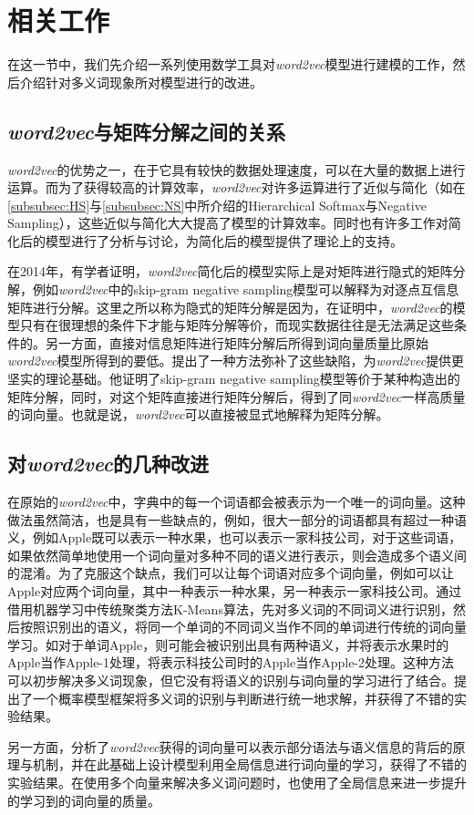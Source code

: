 \iffalse



\fi

\chapter{相关工作}

在这一节中，我们先介绍一系列使用数学工具对\emph{word2vec}模型进行建模的工作，然后介绍针对多义词现象所对模型进行的改进。

\section{\emph{word2vec}与矩阵分解之间的关系}
\label{sec:word2vecmf}

\emph{word2vec}的优势之一，在于它具有较快的数据处理速度，可以在大量的数据上进行运算。而为了获得较高的计算效率，\emph{word2vec}对许多运算进行了近似与简化（如在\ref{subsubsec:HS}与\ref{subsubsec:NS}中所介绍的Hierarchical Softmax与Negative Sampling），这些近似与简化大大提高了模型的计算效率。同时也有许多工作对简化后的模型进行了分析与讨论，为简化后的模型提供了理论上的支持。

在2014年，有学者证明，\emph{word2vec}简化后的模型实际上是对矩阵进行隐式的矩阵分解\citep{levy2014neural}，例如\emph{word2vec}中的skip-gram negative sampling模型可以解释为对逐点互信息矩阵进行分解。这里之所以称为隐式的矩阵分解是因为，在证明中，\emph{word2vec}的模型只有在很理想的条件下才能与矩阵分解等价，而现实数据往往是无法满足这些条件的。另一方面，直接对信息矩阵进行矩阵分解后所得到词向量质量比原始\emph{word2vec}模型所得到的要低。\citep{li2015word}提出了一种方法弥补了这些缺陷，为\emph{word2vec}提供更坚实的理论基础。他证明了skip-gram negative sampling模型等价于某种构造出的矩阵分解，同时，对这个矩阵直接进行矩阵分解后，得到了同\emph{word2vec}一样高质量的词向量。也就是说，\emph{word2vec}可以直接被显式地解释为矩阵分解。

\section{对\emph{word2vec}的几种改进}
\label{sec:intro_poly}

在原始的\emph{word2vec}中，字典中的每一个词语都会被表示为一个唯一的词向量。这种做法虽然简洁，也是具有一些缺点的，例如，很大一部分的词语都具有超过一种语义，例如Apple既可以表示一种水果，也可以表示一家科技公司，对于这些词语，如果依然简单地使用一个词向量对多种不同的语义进行表示，则会造成多个语义间的混淆。为了克服这个缺点，我们可以让每个词语对应多个词向量，例如可以让Apple对应两个词向量，其中一种表示一种水果，另一种表示一家科技公司。\citep{huang2012improving}通过借用机器学习中传统聚类方法K-Means算法\citep{macqueen1967some}，先对多义词的不同词义进行识别，然后按照识别出的语义，将同一个单词的不同词义当作不同的单词进行传统的词向量学习。如对于单词Apple，则可能会被识别出具有两种语义，并将表示水果时的Apple当作Apple-1处理，将表示科技公司时的Apple当作Apple-2处理。这种方法可以初步解决多义词现象，但它没有将语义的识别与词向量的学习进行了结合。\citep{tian2014probabilistic}提出了一个概率模型框架将多义词的识别与判断进行统一地求解，并获得了不错的实验结果。

另一方面，\citep{pennington2014glove}分析了\emph{word2vec}获得的词向量可以表示部分语法与语义信息的背后的原理与机制，并在此基础上设计模型利用全局信息进行词向量的学习，获得了不错的实验结果。\citep{huang2012improving}在使用多个向量来解决多义词问题时，也使用了全局信息来进一步提升的学习到的词向量的质量。